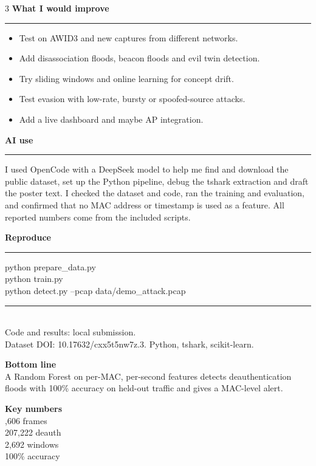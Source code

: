\documentclass[20pt]{extarticle}
\newcommand{\heading}[1]{%
  \vspace{3mm}%
  {\color{navy}\fontsize{30}{34}\selectfont\bfseries #1}\\[-1.5mm]%
  {\color{teal}\rule{\linewidth}{0.9mm}}\par\vspace{1.5mm}%
}
\begin{document}
\begin{multicols}{3}
\heading{What I would improve}
\begin{itemize}[leftmargin=5mm,itemsep=1mm,topsep=1mm]
  \item Test on AWID3 and new captures from different networks.
  \item Add disassociation floods, beacon floods and evil twin detection.
  \item Try sliding windows and online learning for concept drift.
  \item Test evasion with low-rate, bursty or spoofed-source attacks.
  \item Add a live dashboard and maybe AP integration.
\end{itemize}

\heading{AI use}
I used OpenCode with a DeepSeek model to help me find and download the public
dataset, set up the Python pipeline, debug the tshark extraction and draft the
poster text. I checked the dataset and code, ran the training and evaluation,
and confirmed that no MAC address or timestamp is used as a feature. All
reported numbers come from the included scripts.

\heading{Reproduce}
\begin{tcolorbox}[colback=lightgrey,colframe=lightgrey,boxrule=0pt,arc=1mm,
  left=3mm,right=3mm,top=2mm,bottom=2mm]
{\ttfamily\fontsize{15}{18}\selectfont
python prepare\_data.py\\
python train.py\\
python detect.py --pcap data/demo\_attack.pcap}
\end{tcolorbox}

\vspace{2mm}
{\color{navy}\rule{\linewidth}{0.8mm}}\\[1mm]
{\fontsize{15}{18}\selectfont Code and results: local submission.\\
Dataset DOI: 10.17632/cxx5t5nw7z.3. Python, tshark, scikit-learn.}

\end{multicols}

\vfill

\begin{tcolorbox}[colback=navy,coltext=white,boxrule=0pt,arc=2mm,
  left=8mm,right=8mm,top=4mm,bottom=4mm]
\begin{minipage}[c]{0.70\linewidth}
{\color{amber}\fontsize{24}{28}\selectfont\bfseries Bottom line}\\[1mm]
{\fontsize{20}{24}\selectfont A Random Forest on per-MAC, per-second features
detects deauthentication floods with 100\% accuracy on held-out traffic and
gives a MAC-level alert.}
\end{minipage}\hfill
\begin{minipage}[c]{0.26\linewidth}
\centering
{\color{amber}\fontsize{20}{24}\selectfont\bfseries Key numbers}\\[1mm]
{\fontsize{18}{22},606 frames\\207,222 deauth\\2,692 windows\\100\% accuracy}
\end{minipage}
\end{tcolorbox}
\end{document}
